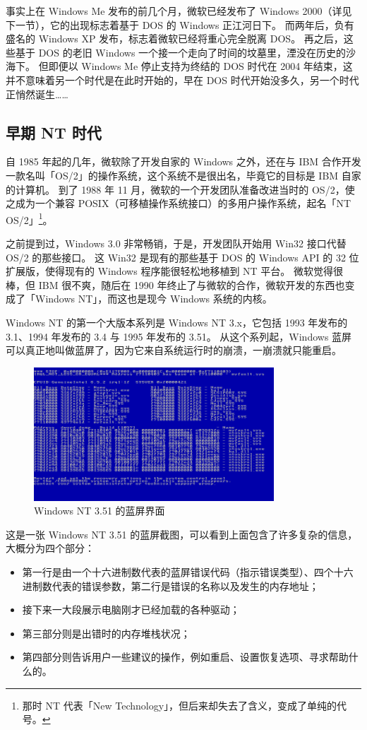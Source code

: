 事实上在 Windows Me 发布的前几个月，微软已经发布了 Windows 2000（详见下一节），它的出现标志着基于 DOS 的 Windows 正江河日下。
而两年后，负有盛名的 Windows XP 发布，标志着微软已经将重心完全脱离 DOS。
再之后，这些基于 DOS 的老旧 Windows 一个接一个走向了时间的坟墓里，湮没在历史的沙海下。
但即便以 Windows Me 停止支持为终结的 DOS 时代在 2004 年结束，这并不意味着另一个时代是在此时开始的，早在 DOS 时代开始没多久，另一个时代正悄然诞生……

\subsection{早期 NT 时代}

自 1985 年起的几年，微软除了开发自家的 Windows 之外，还在与 IBM 合作开发一款名叫「OS/2」的操作系统，这个系统不是很出名，毕竟它的目标是 IBM 自家的计算机。
到了 1988 年 11 月，微软的一个开发团队准备改进当时的 OS/2，使之成为一个兼容 POSIX（可移植操作系统接口）的多用户操作系统，起名「NT OS/2」\footnote{那时 NT 代表「New Technology」，但后来却失去了含义，变成了单纯的代号。}。

之前提到过，Windows 3.0 非常畅销，于是，开发团队开始用 Win32 接口代替 OS/2 的那些接口。
这 Win32 是现有的那些基于 DOS 的 Windows API 的 32 位扩展版，使得现有的 Windows 程序能很轻松地移植到 NT 平台。
微软觉得很棒，但 IBM 很不爽，随后在 1990 年终止了与微软的合作，微软开发的东西也变成了「Windows NT」，而这也是现今 Windows 系统的内核。

Windows NT 的第一个大版本系列是 Windows NT 3.x，它包括 1993 年发布的 3.1、1994 年发布的 3.4 与 1995 年发布的 3.51。
从这个系列起，Windows 蓝屏可以真正地叫做蓝屏了，因为它来自系统运行时的崩溃，一崩溃就只能重启。

\begin{figure}[htb!]
  \centering
  \includegraphics[width=9cm]{assets/Win-NT-3.51-BSoD.png}
  \caption{Windows NT 3.51 的蓝屏界面}
  \label{Win-NT-3.51-BSoD}
\end{figure}

这是一张 Windows NT 3.51 的蓝屏截图，可以看到上面包含了许多复杂的信息，大概分为四个部分：
\begin{itemize}
  \item 第一行是由一个十六进制数代表的蓝屏错误代码（指示错误类型）、四个十六进制数代表的错误参数，第二行是错误的名称以及发生的内存地址；
  \item 接下来一大段展示电脑刚才已经加载的各种驱动；
  \item 第三部分则是出错时的内存堆栈状况；
  \item 第四部分则告诉用户一些建议的操作，例如重启、设置恢复选项、寻求帮助什么的。
\end{itemize}

